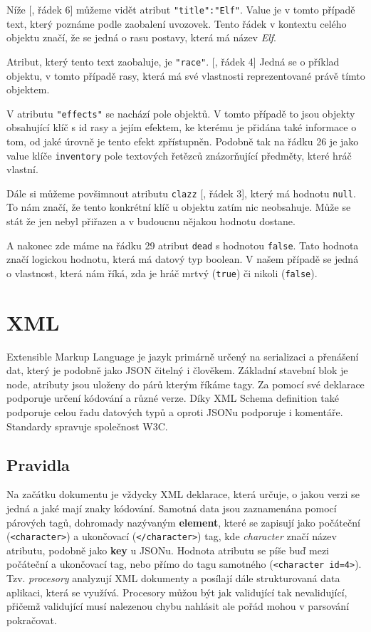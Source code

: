 Níže [, řádek 6] můžeme vidět atribut \verb|"title":"Elf"|. Value je v tomto případě text, který poznáme podle zaobalení uvozovek. Tento řádek v kontextu celého objektu značí, že se jedná o rasu postavy, která má název \textit{Elf}.

Atribut, který tento text zaobaluje, je \texttt{"race"}. [, řádek 4] Jedná se o příklad objektu, v tomto případě rasy, která má své vlastnosti reprezentované právě tímto objektem.

V atributu \texttt{"effects"} se nachází pole objektů. V tomto případě to jsou objekty obsahující klíč s id rasy a jejím efektem, ke kterému je přidána také informace o tom, od jaké úrovně je tento efekt zpřístupněn. Podobně tak na řádku 26 je jako value klíče \texttt{inventory} pole textových řetězců znázorňující předměty, které hráč vlastní.

Dále si můžeme povšimnout atributu \texttt{clazz} [, řádek 3], který má hodnotu \texttt{null}. To nám značí, že tento konkrétní klíč u objektu zatím nic neobsahuje. Může se stát že jen nebyl přiřazen a v budoucnu nějakou hodnotu dostane.

A nakonec zde máme na řádku 29 atribut \texttt{dead} s hodnotou \texttt{false}. Tato hodnota značí logickou hodnotu, která má datový typ boolean. V našem případě se jedná o vlastnost, která nám říká, zda je hráč mrtvý (\texttt{true}) či nikoli (\texttt{false}).


\section{XML}\label{sec:formats:xml}
Extensible Markup Language je jazyk primárně určený na serializaci a přenášení dat, který je podobně jako JSON čitelný i člověkem. Základní stavební blok je node, atributy jsou uloženy do párů kterým říkáme tagy. Za pomocí své deklarace podporuje určení kódování a různé verze. Díky XML Schema definition také podporuje celou řadu datových typů a oproti JSONu podporuje i komentáře. Standardy spravuje společnost W3C. \cite[]{zapierDataFormats} \cite[text]{awsXML} %


\subsection{Pravidla}\label{sec:formats:xml:rules}
Na začátku dokumentu je vždycky XML deklarace, která určuje, o jakou verzi se jedná a jaké mají znaky kódování.
Samotná data jsou zaznamenána pomocí párových tagů, dohromady nazývaným \textbf{element}, které se zapisují jako počáteční (\texttt{<character>}) a ukončovací (\texttt{</character>}) tag, kde \textit{character} značí název atributu, podobně jako \textbf{key} u JSONu. Hodnota atributu se píše buď mezi počáteční a ukončovací tag, nebo přímo do tagu samotného (\texttt{<character id=4>}). Tzv. \textit{procesory} analyzují XML dokumenty a posílají dále strukturovaná data aplikaci, která se využívá. Procesory můžou být jak validující tak nevalidující, přičemž validující musí nalezenou chybu nahlásit ale pořád mohou v parsování pokračovat. \cite[]{w3XMLSchema} \cite[]{enwiki:1218715782}

